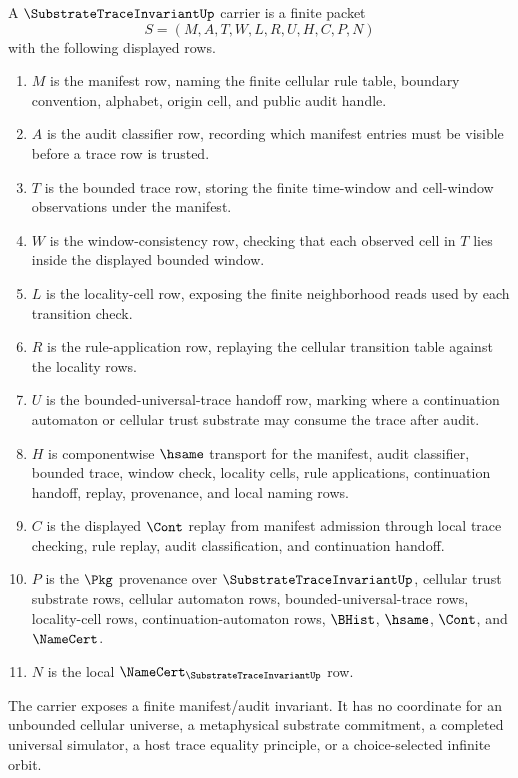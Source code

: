 \begin{definition}
\label{def:substrate-trace-invariant-carrier}
A $\SubstrateTraceInvariantUp$ carrier is a finite packet
$$
S=(M,A,T,W,L,R,U,H,C,P,N)
$$
with the following displayed rows.
\begin{enumerate}
\item $M$ is the manifest row, naming the finite cellular rule table, boundary convention, alphabet, origin cell, and public audit handle.
\item $A$ is the audit classifier row, recording which manifest entries must be visible before a trace row is trusted.
\item $T$ is the bounded trace row, storing the finite time-window and cell-window observations under the manifest.
\item $W$ is the window-consistency row, checking that each observed cell in $T$ lies inside the displayed bounded window.
\item $L$ is the locality-cell row, exposing the finite neighborhood reads used by each transition check.
\item $R$ is the rule-application row, replaying the cellular transition table against the locality rows.
\item $U$ is the bounded-universal-trace handoff row, marking where a continuation automaton or cellular trust substrate may consume the trace after audit.
\item $H$ is componentwise $\hsame$ transport for the manifest, audit classifier, bounded trace, window check, locality cells, rule applications, continuation handoff, replay, provenance, and local naming rows.
\item $C$ is the displayed $\Cont$ replay from manifest admission through local trace checking, rule replay, audit classification, and continuation handoff.
\item $P$ is the $\Pkg$ provenance over $\SubstrateTraceInvariantUp$, cellular trust substrate rows, cellular automaton rows, bounded-universal-trace rows, locality-cell rows, continuation-automaton rows, $\BHist$, $\hsame$, $\Cont$, and $\NameCert$.
\item $N$ is the local $\NameCert_{\SubstrateTraceInvariantUp}$ row.
\end{enumerate}
The carrier exposes a finite manifest/audit invariant. It has no coordinate for an unbounded cellular universe, a metaphysical substrate commitment, a completed universal simulator, a host trace equality principle, or a choice-selected infinite orbit.
\end{definition}

